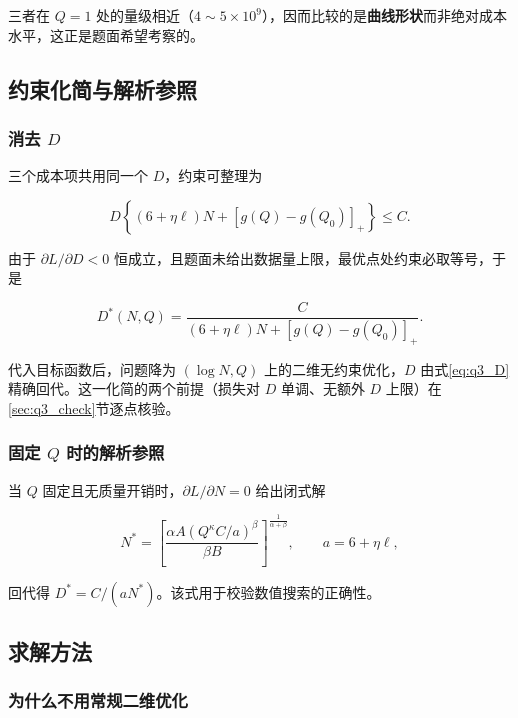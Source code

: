 三者在 $Q=1$ 处的量级相近（$4\sim5\times10^9$），因而比较的是\textbf{曲线形状}而非绝对成本水平，这正是题面希望考察的。

\subsection{约束化简与解析参照}

\subsubsection{消去 $D$}

三个成本项共用同一个 $D$，约束可整理为

\begin{equation}
D\left\{(6+\eta\ell)N+\left[g(Q)-g(Q_0)\right]_+\right\}\le C .
\label{eq:q3_budget}
\end{equation}

由于 $\partial L/\partial D<0$ 恒成立，且题面未给出数据量上限，最优点处约束必取等号，于是

\begin{equation}
D^\ast(N,Q)=\frac{C}{(6+\eta\ell)N+\left[g(Q)-g(Q_0)\right]_+}.
\label{eq:q3_D}
\end{equation}

代入目标函数后，问题降为 $(\log N,Q)$ 上的二维无约束优化，$D$ 由式\eqref{eq:q3_D}精确回代。这一化简的两个前提（损失对 $D$ 单调、无额外 $D$ 上限）在\ref{sec:q3_check}节逐点核验。

\subsubsection{固定 $Q$ 时的解析参照}

当 $Q$ 固定且无质量开销时，$\partial L/\partial N=0$ 给出闭式解

\begin{equation}
N^\ast=\left[\frac{\alpha A\left(Q^{\kappa}C/a\right)^{\beta}}{\beta B}\right]^{\frac{1}{\alpha+\beta}},
\qquad a=6+\eta\ell,
\label{eq:q3_analytic}
\end{equation}

回代得 $D^\ast=C/(aN^\ast)$。该式用于校验数值搜索的正确性。

\subsection{求解方法}

\subsubsection{为什么不用常规二维优化}

